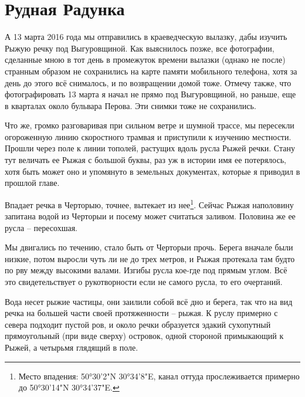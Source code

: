 \chapter{Рудная Радунка}

А 13 марта 2016 года мы отправились в краеведческую вылазку, дабы изучить Рыжую речку под Выгуровщиной. Как выяснилось позже, все фотографии, сделанные мною в тот день в промежуток времени вылазки (однако не после) странным образом не сохранились на карте памяти мобильного телефона, хотя за день до этого всё снималось, и по возвращении домой тоже. Отмечу также, что фотографировать 13 марта я начал не прямо под Выгуровщиной, но раньше, еще в кварталах около бульвара Перова. Эти снимки тоже не сохранились.

Что же, громко разговаривая при сильном ветре и шумной трассе, мы пересекли огороженную линию скоростного трамвая и приступили к изучению местности. Прошли через поле к линии тополей, растущих вдоль русла Рыжей речки. Стану тут величать ее Рыжая с большой буквы, раз уж в истории имя ее потерялось, хотя быть может оно и упомянуто в земельных документах, которые я приводил в прошлой главе.

Впадает речка в Черторыю, точнее, вытекает из нее\footnote{Место впадения: 50°30'2"N  30°34'8"E, канал оттуда прослеживается примерно до 50°30'14"N 30°34'37"E.}. Сейчас Рыжая наполовину запитана водой из Черторыи и посему может считаться заливом. Половина же ее русла – пересохшая. 

Мы двигались по течению, стало быть от Черторыи прочь. Берега вначале были низкие, потом выросли чуть ли не до трех метров, и Рыжая протекала там будто по рву между высокими валами. Изгибы русла кое-где под прямым углом. Всё это свидетельствует о рукотворности если не самого русла, то его очертаний.

Вода несет рыжие частицы, они заилили собой всё дно и берега, так что на вид речка на большей части своей протяженности – рыжая. К руслу примерно с севера подходит пустой ров, и около речки образуется эдакий сухопутный прямоугольный (при виде сверху) островок, одной стороной примыкающий к Рыжей, а четырьмя глядящий в поле.

